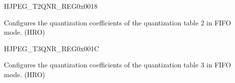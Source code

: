 \begin{register}{H}{JPEG\_T2QNR\_REG}{0x0018}\label{regdesc:JPEGT2QNRREG}
%
\regnewline%
\begin{regdesc}\begin{reglist}
\label{fielddesc:JPEGT2QNRVAL}\item [JPEG\_T2\_QNR\_VAL] Configures the quantization coefficients of the quantization table 2 in FIFO mode. (HRO)
\end{reglist}\end{regdesc}
\end{register}


\begin{register}{H}{JPEG\_T3QNR\_REG}{0x001C}\label{regdesc:JPEGT3QNRREG}
%
\regnewline%
\begin{regdesc}\begin{reglist}
\label{fielddesc:JPEGT3QNRVAL}\item [JPEG\_T3\_QNR\_VAL] Configures the quantization coefficients of the quantization table 3 in FIFO mode. (HRO)
\end{reglist}\end{regdesc}
\end{register}



